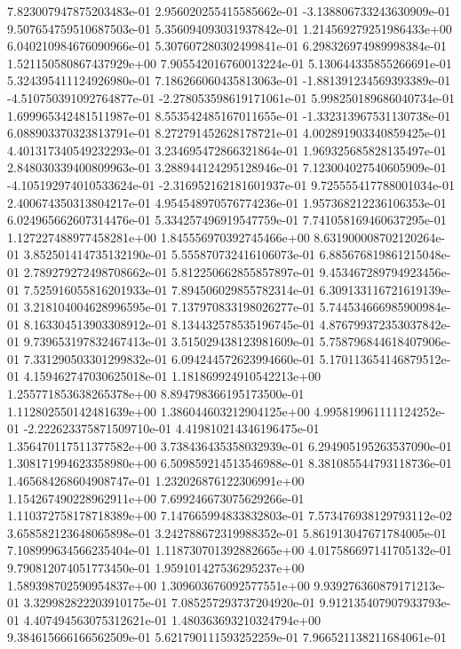 7.823007947875203483e-01
2.956020255415585662e-01
-3.138806733243630909e-01
9.507654759510687503e-01
5.356094093031937842e-01
1.214569279251986433e+00
6.040210984676090966e-01
5.307607280302499841e-01
6.298326974989998384e-01
1.521150580867437929e+00
7.905542016760013224e-01
5.130644335855266691e-01
5.324395411124926980e-01
7.186266060435813063e-01
-1.881391234569393389e-01
-4.510750391092764877e-01
-2.278053598619171061e-01
5.998250189686040734e-01
1.699965342481511987e-01
8.553542485167011655e-01
-1.332313967531130738e-01
6.088903370323813791e-01
8.272791452628178721e-01
4.002891903340859425e-01
4.401317340549232293e-01
3.234695472866321864e-01
1.969325685828135497e-01
2.848030339400809963e-01
3.288944124295128946e-01
7.123004027540605909e-01
-4.105192974010533624e-01
-2.316952162181601937e-01
9.725555417788001034e-01
2.400674350313804217e-01
4.954548970576774236e-01
1.957368212236106353e-01
6.024965662607314476e-01
5.334257496919547759e-01
7.741058169460637295e-01
1.127227488977458281e+00
1.845556970392745466e+00
8.631900008702120264e-01
3.852501414735132190e-01
5.555870732416106073e-01
6.885676819861215048e-01
2.789279272498708662e-01
5.812250662855857897e-01
9.453467289794923456e-01
7.525916055816201933e-01
7.894506029855782314e-01
6.309133116721619139e-01
3.218104004628996595e-01
7.137970833198026277e-01
5.744534666985900984e-01
8.163304513903308912e-01
8.134432578535196745e-01
4.876799372353037842e-01
9.739653197832467413e-01
3.515029438123981609e-01
5.758796844618407906e-01
7.331290503301299832e-01
6.094244572623994660e-01
5.170113654146879512e-01
4.159462747030625018e-01
1.181869924910542213e+00
1.255771853638265378e+00
8.894798366195173500e-01
1.112802550142481639e+00
1.386044603212904125e+00
4.995819961111124252e-01
-2.222623375871509710e-01
4.419810214346196475e-01
1.356470117511377582e+00
3.738436435358032939e-01
6.294905195263537090e-01
1.308171994623358980e+00
6.509859214513546988e-01
8.381085544793118736e-01
1.465684268604908747e-01
1.232026876122306991e+00
1.154267490228962911e+00
7.699246673075629266e-01
1.110372758178718389e+00
7.147665994833832803e-01
7.573476938129793112e-02
3.658582123648065898e-01
3.242788672319988352e-01
5.861913047671784005e-01
7.108999634566235404e-01
1.118730701392882665e+00
4.017586697141705132e-01
9.790812074051773450e-01
1.959101427536295237e+00
1.589398702590954837e+00
1.309603676092577551e+00
9.939276360879171213e-01
3.329982822203910175e-01
7.085257293737204920e-01
9.912135407907933793e-01
4.407494563075312621e-01
1.480363693210324794e+00
9.384615666166562509e-01
5.621790111593252259e-01
7.966521138211684061e-01

